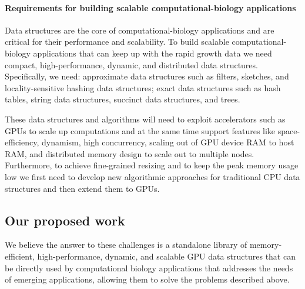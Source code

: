 


\paragraph{Requirements for building scalable computational-biology applications}

Data structures are the core of computational-biology applications and are critical for their performance and scalability.
To build scalable computational-biology applications that can keep up with the rapid growth data we need compact, high-performance, dynamic, and distributed data structures. Specifically, we need: approximate data structures such as filters, sketches, and locality-sensitive hashing data structures; exact data structures such as hash tables, string data structures, succinct data structures, and trees.

These data structures and algorithms will need to exploit accelerators such as GPUs to scale up computations and at the same time support  features like space-efficiency, dynamism, high concurrency, scaling out of GPU device RAM to host RAM, and distributed memory design to scale out to multiple nodes.
%
Furthermore, to achieve fine-grained resizing and to keep the peak memory usage low we first need to develop new algorithmic approaches for traditional CPU data structures and then extend them to GPUs.

\subsection{Our proposed work}

We believe the answer to these challenges is a standalone library of memory-efficient, high-performance, dynamic, and scalable GPU data structures that can be directly used by computational biology applications that addresses the needs of emerging applications, allowing them to solve the problems described above.

